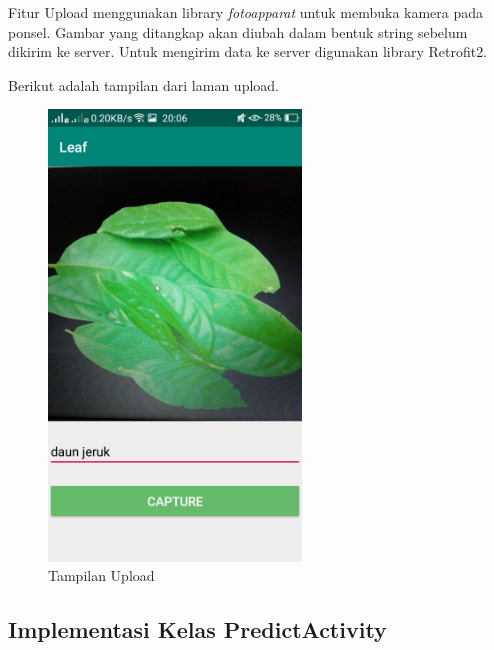 \par Fitur Upload menggunakan library \textit{fotoapparat} untuk membuka kamera pada ponsel. Gambar yang ditangkap akan diubah dalam bentuk string sebelum dikirim ke server. Untuk mengirim data ke server digunakan library Retrofit2.

\par Berikut adalah tampilan dari laman upload.
\begin{figure}[H]
	\centering\includegraphics[width=0.6\textwidth]{bab4/figures/upload.png}
	\caption{Tampilan Upload}
	\label{fig:upload}
\end{figure}

\subsection{Implementasi Kelas PredictActivity}

